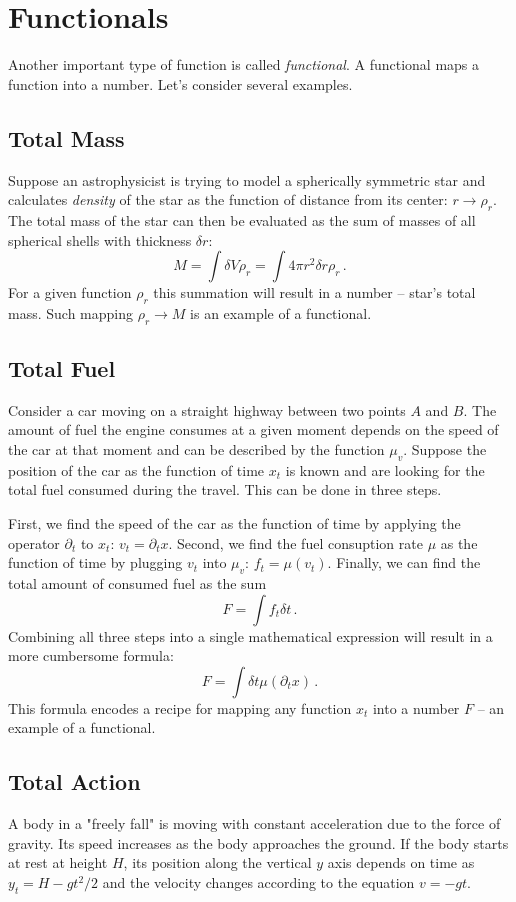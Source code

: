 \section{Functionals}
Another important type of function is called \emph{functional}. A functional maps a function into a number. Let's consider several examples.

\subsection*{Total Mass}
Suppose an astrophysicist is trying to model a spherically symmetric star and calculates \emph{density} of the star as the function of distance from its center: $r\rightarrow\rho_r$. The total mass of the star can then be evaluated as the sum of masses of all spherical shells with thickness $\delta r$:
\[
M = \int \delta V\rho_r=\int 4\pi r^2\delta r\rho_r\,.
\]
For a given function $\rho_r$ this summation will result in a number -- star's total mass. Such mapping $\rho_r\rightarrow M$ is an example of a functional.

\subsection*{Total Fuel}
Consider a car moving on a straight highway between two points $A$ and $B$. The amount of fuel the engine consumes at a given moment depends on the speed of the car at that moment and can be described by the function $\mu_v$. Suppose the position of the car as the function of time $x_t$ is known and are looking for the total fuel consumed during the travel. This can be done in three steps. 

First, we find the speed of the car as the function of time by applying the operator $\partial_t$ to $x_t$: $v_t=\partial_{t}x$. Second, we find the fuel consuption rate $\mu$  as the function of time by plugging $v_t$ into $\mu_v$: $f_t = \mu(v_t)$. Finally, we can find the total amount of consumed fuel as the sum
\[
F = \int f_t\delta t\,.
\]
Combining all three steps into a single mathematical expression will result in a more cumbersome formula:
\[
F = \int \delta t\mu(\partial_t x)\,.
\]
This formula encodes a recipe for mapping any function $x_t$ into a number $F$ -- an example of a functional.

\subsection*{Total Action}
A body in a "freely fall" is moving with constant acceleration due to the force of gravity. Its speed increases as the body approaches the ground. If the body starts at rest at height $H$, its position along the vertical $y$ axis depends on time as $y_t=H-gt^2/2$ and the velocity changes according to the equation $v=-gt$.


